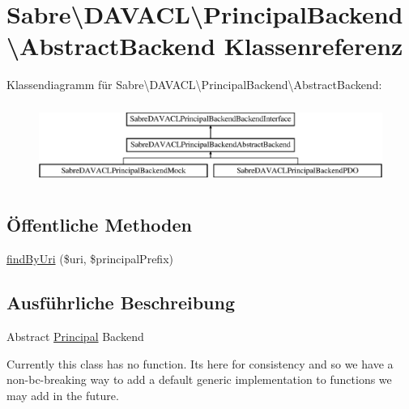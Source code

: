 \hypertarget{class_sabre_1_1_d_a_v_a_c_l_1_1_principal_backend_1_1_abstract_backend}{}\section{Sabre\textbackslash{}D\+A\+V\+A\+CL\textbackslash{}Principal\+Backend\textbackslash{}Abstract\+Backend Klassenreferenz}
\label{class_sabre_1_1_d_a_v_a_c_l_1_1_principal_backend_1_1_abstract_backend}
Klassendiagramm für Sabre\textbackslash{}D\+A\+V\+A\+CL\textbackslash{}Principal\+Backend\textbackslash{}Abstract\+Backend\+:\begin{figure}[H]
\begin{center}
\leavevmode
\includegraphics[height=2.658228cm]{class_sabre_1_1_d_a_v_a_c_l_1_1_principal_backend_1_1_abstract_backend}
\end{center}
\end{figure}
\subsection*{Öffentliche Methoden}
\begin{DoxyCompactItemize}
\item 
\mbox{\hyperlink{class_sabre_1_1_d_a_v_a_c_l_1_1_principal_backend_1_1_abstract_backend_a2ffb47954e7df053074c2f319e4e2c7e}{find\+By\+Uri}} (\$uri, \$principal\+Prefix)
\end{DoxyCompactItemize}


\subsection{Ausführliche Beschreibung}
Abstract \mbox{\hyperlink{class_sabre_1_1_d_a_v_a_c_l_1_1_principal}{Principal}} Backend

Currently this class has no function. It\textquotesingle{}s here for consistency and so we have a non-\/bc-\/breaking way to add a default generic implementation to functions we may add in the future.

